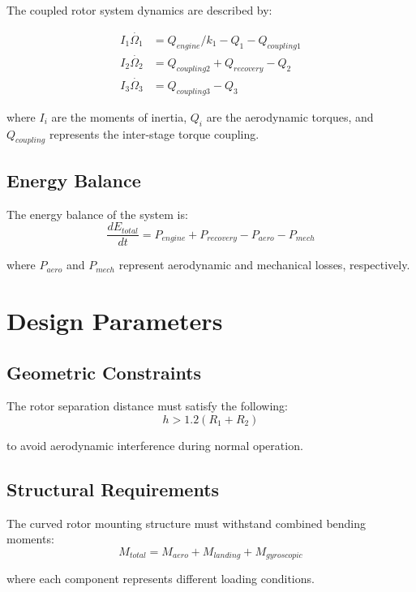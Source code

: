 \documentclass[12pt,a4paper]{article}
\begin{document}
The coupled rotor system dynamics are described by:

\begin{align}
I_1\dot{\Omega_1} &= Q_{engine}/k_1 - Q_1 - Q_{coupling1} \\
I_2\dot{\Omega_2} &= Q_{coupling2} + Q_{recovery} - Q_2 \\
I_3\dot{\Omega_3} &= Q_{coupling3} - Q_3
\end{align}

where $I_i$ are the moments of inertia, $Q_i$ are the aerodynamic torques, and $Q_{coupling}$ represents the inter-stage torque coupling.

\subsection{Energy Balance}

The energy balance of the system is:
\begin{equation}
\frac{dE_{total}}{dt} = P_{engine} + P_{recovery} - P_{aero} - P_{mech}
\end{equation}

where $P_{aero}$ and $P_{mech}$ represent aerodynamic and mechanical losses, respectively.

\section{Design Parameters}

\subsection{Geometric Constraints}

The rotor separation distance must satisfy the following:
\begin{equation}
h > 1.2(R_1 + R_2)
\end{equation}

to avoid aerodynamic interference during normal operation.

\subsection{Structural Requirements}

The curved rotor mounting structure must withstand combined bending moments:
\begin{equation}
M_{total} = M_{aero} + M_{landing} + M_{gyroscopic}
\end{equation}

where each component represents different loading conditions.
\end{document}
